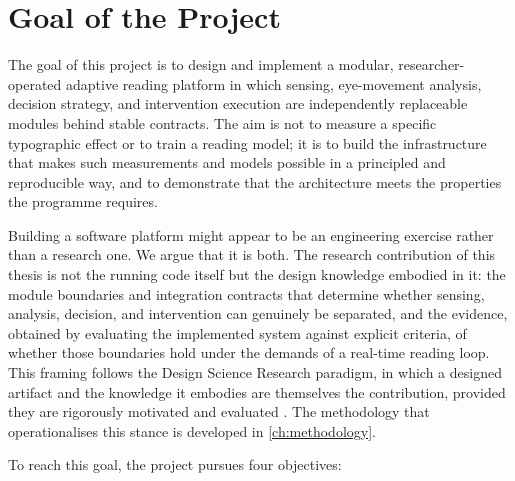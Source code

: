 \section{Goal of the Project}
\label{sec:goal}

The goal of this project is to design and implement a modular, researcher-operated adaptive reading platform in which sensing, eye-movement analysis, decision strategy, and intervention execution are independently replaceable modules behind stable contracts.
The aim is not to measure a specific typographic effect or to train a reading model; it is to build the infrastructure that makes such measurements and models possible in a principled and reproducible way, and to demonstrate that the architecture meets the properties the programme requires.

Building a software platform might appear to be an engineering exercise rather than a research one.
We argue that it is both.
The research contribution of this thesis is not the running code itself but the design knowledge embodied in it: the module boundaries and integration contracts that determine whether sensing, analysis, decision, and intervention can genuinely be separated, and the evidence, obtained by evaluating the implemented system against explicit criteria, of whether those boundaries hold under the demands of a real-time reading loop.
This framing follows the Design Science Research paradigm, in which a designed artifact and the knowledge it embodies are themselves the contribution, provided they are rigorously motivated and evaluated \cite{hevner2004designscience}.
The methodology that operationalises this stance is developed in \cref{ch:methodology}.

To reach this goal, the project pursues four objectives:

